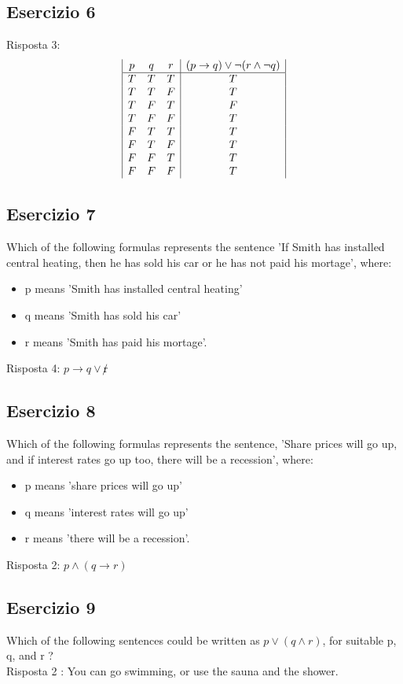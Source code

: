 \documentclass[a4paper]{article}
\begin{document}
\subsection{Esercizio 6}
Risposta 3:
\begin{displaymath}
\begin{array}{|c c c|c|}
p & q & r & (p \rightarrow q) \lor \lnot (r \land \lnot q) \\
\hline 
T & T & T & T \\
T & T & F & T \\
T & F & T & F \\
T & F & F & T \\
F & T & T & T \\
F & T & F & T \\
F & F & T & T \\
F & F & F & T \\
\end{array}
\end{displaymath}
\subsection{Esercizio 7}
Which of the following formulas represents the sentence 'If Smith has installed central heating, then he has sold his car or he has not paid his mortage', where:
\begin{itemize}
	\item p means 'Smith has installed central heating'
	\item q means 'Smith has sold his car'
	\item r means 'Smith has paid his mortage'.
\end{itemize}
Risposta 4: $ p \rightarrow q \lor \not r $
\subsection{Esercizio 8}
Which of the following formulas represents the sentence, 'Share prices will go up, and if interest rates go up too, there will be a recession', where:
\begin{itemize}
	\item p means 'share prices will go up'
	\item q means 'interest rates will go up'
	\item r means 'there will be a recession'.
\end{itemize}
Risposta 2: $p \land (q \rightarrow r) $
\subsection{Esercizio 9}
Which of the following sentences could be written as $ p \lor (q \land r)$, for suitable p, q, and r ?\\
Risposta 2 : You can go swimming, or use the sauna and the shower.
\end{document}
